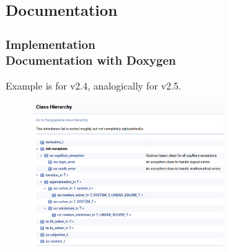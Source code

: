 \documentclass[ucs,10pt]{beamer}
\begin{document}
\subsection{Documentation}

\begin{frame}
\frametitle{Implementation \\
        \small \color{rwth-blue} Documentation with Doxygen}
	Example is for v2.4, analogically for v2.5.
        \begin{figure}
		\includegraphics[width=0.65\textwidth]{figures/class_hierarchy_doc.png}                
        \end{figure}
\end{frame}
\end{document}
